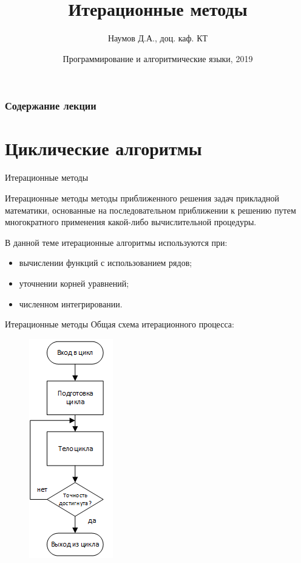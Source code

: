 \documentclass{beamer}
\title[Итерционные методы]{Итерационные методы}
\author{Наумов Д.А., доц. каф. КТ}
\date[31.10.2019] {Программирование и алгоритмические языки, 2019}
\begin{document}
\begin{frame}
  \titlepage
\end{frame}
  
\begin{frame}
  \frametitle{Содержание лекции}
  \tableofcontents  
\end{frame}

\section{Циклические алгоритмы}

\begin{frame}{Итерационные методы}
\begin{block}{Итерационные методы}
методы приближенного решения задач прикладной математики, основанные на последовательном приближении к решению путем многократного применения какой-либо вычислительной процедуры.
\end{block}
В данной теме итерационные алгоритмы используются при:
\begin{itemize}
\item вычислении функций с использованием рядов;
\item уточнении корней уравнений;
\item численном интегрировании.
\end{itemize}
\end{frame} 

\begin{frame}{Итерационные методы}
Общая схема итерационного процесса:
\begin{figure}[h]
\centering
\includegraphics[scale=0.75]{images/lec05-pic01.png}
\end{figure}
\end{frame} 
\end{document}
